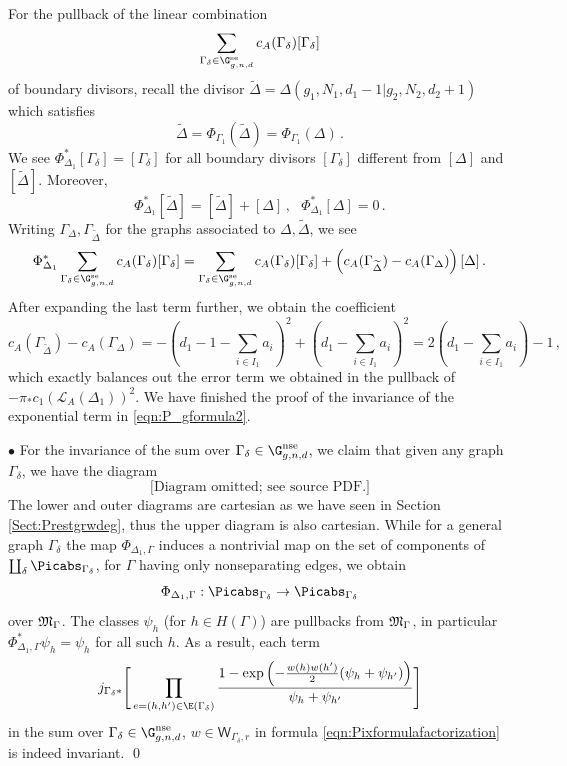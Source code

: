 For the pullback of the linear combination
\[\sum_{\Gamma_\delta \in \G_{g,n,d}^\textup{se}} c_A(\Gamma_\delta) [\Gamma_\delta]\]
of boundary divisors, recall the divisor $\widetilde \Delta = \Delta(g_1, N_1, d_1-1|g_2, N_2, d_2+1)$ which satisfies $$\widetilde \Delta = \Phi_{\Gamma_1}(\widetilde \Delta) = \Phi_{\Gamma_1}(\Delta)\, .$$
We see $\Phi_{\Delta_1}^* [\Gamma_\delta] = [\Gamma_\delta]$ for all boundary divisors $[\Gamma_\delta]$ different from $[\Delta]$ and $[\widetilde \Delta]$. Moreover,
$$\Phi_{\Delta_1}^* [\widetilde \Delta] = [\widetilde \Delta] + [\Delta]\, , \ \ \ \Phi_{\Delta_1}^* [\Delta] = 0\, .$$
Writing $\Gamma_{\Delta}, \Gamma_{\widetilde \Delta}$ for the graphs associated to $\Delta, \widetilde \Delta$, we see
\[\Phi_{\Delta_1}^* \sum_{\Gamma_\delta \in \G_{g,n,d}^\textup{se}} c_A(\Gamma_\delta) [\Gamma_\delta] = \sum_{\Gamma_\delta \in \G_{g,n,d}^\textup{se}} c_A(\Gamma_\delta) [\Gamma_\delta] + \left(c_A(\Gamma_{\widetilde \Delta}) - c_A(\Gamma_\Delta) \right) [\Delta]\,.\]
After expanding the last term further, we obtain the coefficient
\[c_A(\Gamma_{\widetilde \Delta}) - c_A(\Gamma_\Delta) = - (d_1 - 1 - \sum_{i \in I_1}a_i)^2 + (d_1  - \sum_{i \in I_1}a_i)^2 = 2 (d_1 - \sum_{i \in I_1} a_i) -1\,, \]
which exactly balances out the error term we obtained in the pullback of $- \pi_* c_1(\mathcal{L}_A(\Delta_1))^2$.
We have finished the proof of the invariance of the exponential term in \eqref{eqn:P_gformula2}.

 $\bullet$
For the invariance of the sum over $\Gamma_\delta\in \G_{g,n,d}^\textup{nse}$, we claim that given any graph $\Gamma_\delta$, we have the diagram
\begin{equation}
\text{[Diagram omitted; see source PDF.]}
\end{equation}
The lower and outer diagrams are cartesian as we have seen in Section \ref{Sect:Prestgrwdeg}, thus the upper diagram is also cartesian. While for a general graph $\Gamma_\delta$ the map $\Phi_{\Delta_1,\Gamma}$ induces a nontrivial map on the set of components of $\coprod_{\delta} \Picabs_{\Gamma_\delta}$, for $\Gamma$ having only nonseparating edges, we obtain  $$\Phi_{\Delta_1, \Gamma} : \Picabs_{\Gamma_\delta} \to \Picabs_{\Gamma_\delta}$$ over $\frak M_{\Gamma}$.
The classes $\psi_h$ (for $h \in H(\Gamma)$) are pullbacks from $\frak M_\Gamma$, in particular $\Phi_{\Delta_1,\Gamma}^* \psi_h = \psi_h$ for all such $h$.
As a result, each term
\[
j_{\Gamma_\delta*}\Bigg[
\prod_{e=(h,h')\in \E(\Gamma_\delta)}
\frac{1-\exp\left(-\frac{w(h)w(h')}2(\psi_h+\psi_{h'})\right)}{\psi_h + \psi_{h'}} \Bigg]
\]
in the sum over $\Gamma_\delta\in \G_{g,n,d}^\textup{nse}$, $w\in \mathsf{W}_{\Gamma_\delta,r}$ in formula
\eqref{eqn:Pixformulafactorization}
is indeed invariant. \qed

